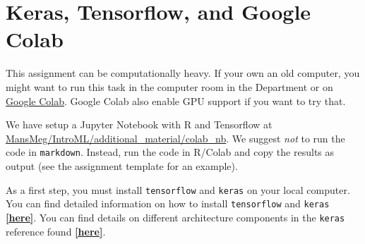 \section*{Keras, Tensorflow, and Google Colab}

This assignment can be computationally heavy. If your own an old computer, you might want to run this task in the computer room in the Department or on  \href{https://colab.google/}{Google Colab}. Google Colab also enable GPU support if you want to try that.

We have setup a Jupyter Notebook with R and Tensorflow at \href{https://github.com/MansMeg/IntroML/tree/master/additional_material/colab_nb}{MansMeg/IntroML/additional\_material/colab\_nb}. We suggest \emph{not} to run the code in \texttt{markdown}. Instead, run the code in R/Colab and copy the results as output (see the assignment template for an example).

As a first step, you must install \texttt{tensorflow} and \texttt{keras} on your local computer. You can find detailed information on how to install \texttt{tensorflow} and \texttt{keras} \textbf{\href{https://tensorflow.rstudio.com/install/}{[here]}}. You can find details on different architecture components in the \texttt{keras} reference found \textbf{\href{https://keras.rstudio.com/index.html}{[here]}}.

